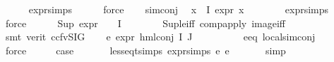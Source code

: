 \begin{isabellebody}
\ \ \ \ \isamarkupfalse%
\ expr{\isacharunderscore}{\kern0pt}{}{\isachardot}{\kern0pt}simps\isanewline
\ \ \ \ \isamarkupfalse%
\ force\isanewline
\ \ \isamarkupfalse%
\ sim{\isacharunderscore}{\kern0pt}conj\ \isamarkupfalse%
\ {\isachardoublequoteopen}{\isasymforall}x{\isasymin}{\isasymPhi}\ {\isacharbackquote}{\kern0pt}\ I{\isachardot}{\kern0pt}\ expr{\isacharunderscore}{\kern0pt}{}\ x\ {\isasymle}\ {}{\isachardoublequoteclose}\isanewline
\ \ \ \ \isamarkupfalse%
\ expr{\isachardot}{\kern0pt}simps\ \isanewline
\ \ \ \ \isamarkupfalse%
\ force\isanewline
\ \ \ \ \isamarkupfalse%
\ {\isachardoublequoteopen}Sup\ {\isacharparenleft}{\kern0pt}{\isacharparenleft}{\kern0pt}expr{\isacharunderscore}{\kern0pt}{}\ {\isasymcirc}\ {\isasymPhi}{\isacharparenright}{\kern0pt}\ {\isacharbackquote}{\kern0pt}\ I{\isacharparenright}{\kern0pt}\ {\isasymle}\ {}{\isachardoublequoteclose}\isanewline
\ \ \ \ \isamarkupfalse%
\ Sup{\isacharunderscore}{\kern0pt}le{\isacharunderscore}{\kern0pt}iff\ comp{\isacharunderscore}{\kern0pt}apply\ image{\isacharunderscore}{\kern0pt}iff\isanewline
\ \ \ \ \isamarkupfalse%
\ {\isacharparenleft}{\kern0pt}smt\ {\isacharparenleft}{\kern0pt}verit{\isacharcomma}{\kern0pt}\ ccfv{\isacharunderscore}{\kern0pt}SIG{\isacharparenright}{\kern0pt}{\isacharparenright}{\kern0pt}\isanewline
\ \ \isamarkupfalse%
\ e{}{\isacharcolon}{\kern0pt}\ {\isachardoublequoteopen}expr{\isacharunderscore}{\kern0pt}{}\ {\isacharparenleft}{\kern0pt}hml{\isacharunderscore}{\kern0pt}conj\ I\ J\ {\isasymPhi}{\isacharparenright}{\kern0pt}\ {\isasymle}\ {}{\isachardoublequoteclose}\ \isanewline
\ \ \ \ \isamarkupfalse%
\ e{}{\isacharunderscore}{\kern0pt}eq\ local{\isachardot}{\kern0pt}sim{\isacharunderscore}{\kern0pt}conj\isanewline
\ \ \ \ \isamarkupfalse%
\ force\isanewline
\ \ \isamarkupfalse%
\ \isamarkupfalse%
\ {\isacharquery}{\kern0pt}case\ \isanewline
\ \ \ \ \isamarkupfalse%
\ less{\isacharunderscore}{\kern0pt}eq{\isacharunderscore}{\kern0pt}t{\isachardot}{\kern0pt}simps\ expr{\isachardot}{\kern0pt}simps\ e{}\ e{}\ \isanewline
\ \ \ \ \isamarkupfalse%
\ simp\ \isanewline
{}\isamarkupfalse%
%
\endisatagproof
{\isafoldproof}%
%
\isadelimproof
\isanewline
%
\endisadelimproof

\end{isabellebody}
